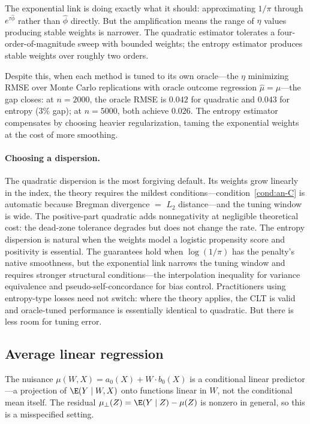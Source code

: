 \documentclass{article}
\begin{document}
The exponential link
is doing exactly what it should:
approximating $1/\pi$
through $e^{\tau\hat\phi}$
rather than $\hat\phi$ directly.
But the amplification means
the range of $\eta$ values
producing stable weights is narrower.
The quadratic estimator tolerates
a four-order-of-magnitude sweep
with bounded weights;
the entropy estimator
produces stable weights
over roughly two orders.

Despite this,
when each method is tuned to its own oracle---the
$\eta$ minimizing RMSE
over Monte Carlo replications
with oracle outcome regression
$\hat\mu = \mu$---the
gap closes:
at $n = 2000$,
the oracle RMSE is $0.042$ for quadratic
and $0.043$ for entropy
($3\%$ gap);
at $n = 5000$,
both achieve $0.026$.
The entropy estimator compensates
by choosing heavier regularization,
taming the exponential weights
at the cost of more smoothing.

\paragraph{Choosing a dispersion.}
The quadratic dispersion
is the most forgiving default.
Its weights grow linearly in the index,
the theory requires
the mildest conditions---condition~\ref{cond:an-C}
is automatic
because Bregman divergence $=$ $L_2$ distance---and
the tuning window is wide.
The positive-part quadratic adds nonnegativity
at negligible theoretical cost:
the dead-zone tolerance degrades
but does not change the rate.
The entropy dispersion is natural
when the weights model
a logistic propensity score
and positivity is essential.
The guarantees hold
when $\log(1/\pi)$
has the penalty's native smoothness,
but the exponential link
narrows the tuning window
and requires stronger structural conditions---the
interpolation inequality for variance equivalence
and pseudo-self-concordance for bias control.
Practitioners using entropy-type losses need not switch:
where the theory applies,
the CLT is valid
and oracle-tuned performance
is essentially identical to quadratic.
But there is less room for tuning error.

\subsection{Average linear regression}
\label{sec:example-regression}

The nuisance $\mu(W,X) = a_0(X) + W \cdot b_0(X)$
is a conditional linear predictor---a projection
of $\E(Y \mid W,X)$ onto functions linear in $W$,
not the conditional mean itself.
The residual $\mu_\perp(Z) = \E(Y \mid Z) - \mu(Z)$
is nonzero in general,
so this is a misspecified setting.
\end{document}
